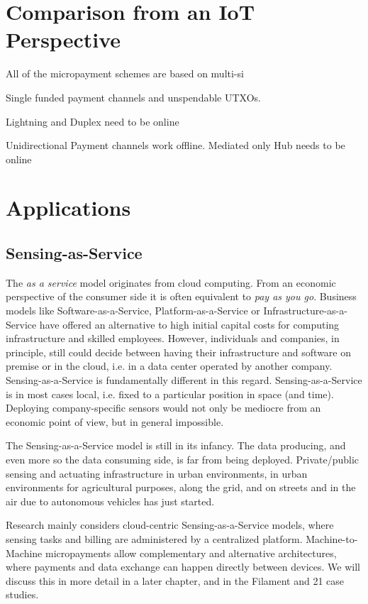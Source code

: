 \section{Comparison from an IoT Perspective}

All of the micropayment schemes are based on multi-si

Single funded payment channels and unspendable UTXOs.

Lightning and Duplex need to be online 

Unidirectional Payment channels work offline. Mediated only Hub needs to be online 

\section{Applications}

\subsection{Sensing-as-Service}
\label{sec:micro:apps:s2aas}

The \emph{as a service} model originates from cloud computing. From an economic perspective of the consumer side it is often equivalent to \emph{pay as you go}. Business models like Software-as-a-Service, Platform-as-a-Service or Infrastructure-as-a-Service have offered an alternative to high initial capital costs for computing infrastructure and skilled employees. However, individuals and companies, in principle, still could decide between having their infrastructure and software on premise or in the cloud, i.e. in a data center operated by another company. Sensing-as-a-Service is fundamentally different in this regard. Sensing-as-a-Service is in most cases local, i.e. fixed to a particular position in space (and time). Deploying company-specific sensors would not only be mediocre from an economic point of view, but in general impossible. 

The Sensing-as-a-Service model is still in its infancy. The data producing, and even more so the data consuming side, is far from being deployed. Private/public sensing and actuating infrastructure in urban environments, in urban environments for agricultural purposes, along the grid, and on streets and in the air due to autonomous vehicles has just started.

Research mainly considers cloud-centric Sensing-as-a-Service models, where sensing tasks and billing are administered by a centralized platform. Machine-to-Machine micropayments allow complementary and alternative architectures, where payments and data exchange can happen directly between devices. We will discuss this in more detail in a later chapter, and in the Filament and 21 case studies.


